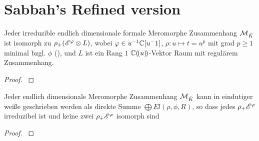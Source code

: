 \section{Sabbah's Refined version}



\begin{prop}
  \cite[Prop 3.1]{sabbah_Fourier-local}
  Jeder irreduzible endlich dimensionale formale Meromorphe Zusammenhang
  $\mathcal{M}_{\hat K}$ ist isomorph zu $\rho_+(\mathscr{E}^\varphi\otimes L)$, wobei $\varphi\in
  u^{-1}\mathbb{C}[u^-1]$, $\rho:u\mapsto t=u^p$ mit grad $p\geq1$ minimal bzgl. $\phi$
  (\cite[Rem 2.8]{sabbah_Fourier-local}), und $L$ ist ein Rang $1$
  ${\mathbb C (\!(u)\!)}$-Vektor Raum mit regulärem Zusammenhang.
\end{prop}
\begin{proof}
  \cite[Prop 3.1]{sabbah_Fourier-local}
\end{proof}

\begin{thm}
  \cite[Cor 3.3]{sabbah_Fourier-local}
  Jeder endlich dimensionale Meromorphe Zusammenhang $\mathcal{M}_{\hat K}$ kann in
  eindutiger weiße geschrieben werden als direkte Summe $\bigoplus
  El(\rho,\phi,R)$, so dass jedes $\rho_+\mathscr{E}^\varphi$ irreduzibel ist und keine
  zwei $\rho_+\mathscr{E}^\varphi$ isomorph sind
\end{thm}
\begin{proof}
  \cite[Cor 3.3]{sabbah_Fourier-local}
\end{proof}

